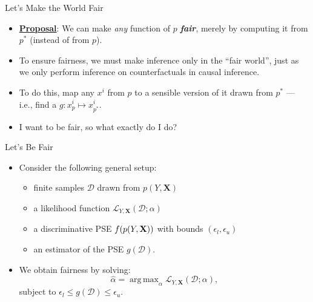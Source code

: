 \documentclass[12pt,t,handout]{beamer}
\newcommand{\D}{\mathcal{D}}
\newcommand{\lik}{\mathcal{L}}
\DeclareMathOperator*{\argmax}{arg\,max}
\begin{document}

\begin{frame}[c]{Let's Make the World Fair}

\begin{center}
\begin{itemize}
  \itemsep10pt
  \item \underline{\textbf{Proposal}}: We can make \textit{any} function of $p$
    \textbf{\textit{fair}}, merely by computing it from $p^*$ (instead of from
    $p$).
  \item To ensure fairness, we must make inference only in the ``fair world'',
    just as we only perform inference on counterfactuals in causal inference.
  \item To do this, map any $x^i$ from $p$ to a sensible version of it drawn
    from $p^*$ --- i.e., find a $g: x^i_{p} \mapsto x^i_{p^*}$.
  \item I want to be fair, so what exactly do I do?
\end{itemize}
\end{center}


\end{frame}


\begin{frame}[c]{Let's Be Fair}

\begin{center}
\begin{itemize}
  \itemsep10pt
  \item Consider the following general setup:
    \begin{itemize}
      \item finite samples $\D$ drawn from $p(Y, \bm{X})$
      \item a likelihood function $\lik_{Y, \bm{X}}(\D; \alpha)$
      \item a discriminative PSE $f(p(Y, \bf{X}))$ with bounds $(\epsilon_l,
        \epsilon_u)$
      \item an estimator of the PSE $g(\D)$.
    \end{itemize}
  \item We obtain fairness by solving:
    $$\hat{\alpha} = \argmax_{\alpha} \lik_{Y, \bm{X}} (\D; \alpha),$$
    subject to $\epsilon_l \leq g(\D) \leq \epsilon_u.$
\end{itemize}
\end{center}


\end{frame}
\end{document}
